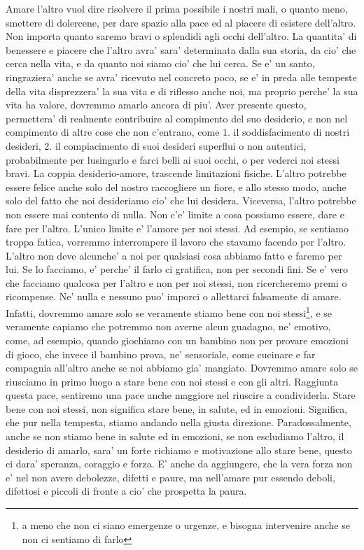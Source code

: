 Amare l'altro vuol dire risolvere il prima possibile i nostri mali, o quanto meno, smettere di dolercene, per dare spazio alla pace ed al piacere di esistere dell'altro. Non importa quanto saremo bravi o splendidi agli occhi dell'altro. 
La quantita' di benessere e piacere che l'altro avra' sara' determinata dalla sua storia, da cio' che cerca nella vita, e da quanto noi siamo cio' che lui cerca.
Se e' un santo, ringraziera' anche se avra' ricevuto nel concreto poco, se e' in preda alle tempeste della vita disprezzera' la sua vita e di riflesso anche noi, ma proprio perche' la sua vita ha valore, dovremmo amarlo ancora di piu'.
Aver presente questo, permettera' di realmente contribuire al compimento del suo desiderio, e non nel compimento di altre cose che non c'entrano, come 1. il soddisfacimento di nostri desideri, 2. il compiacimento di suoi desideri superflui o non autentici, probabilmente per lusingarlo e farci belli ai suoi occhi, o per vederci noi stessi bravi.
La coppia desiderio-amore, trascende limitazioni fisiche. L'altro potrebbe essere felice anche solo del nostro raccogliere un fiore, e allo stesso modo, anche solo del fatto che noi desideriamo cio' che lui desidera. Viceversa, l'altro potrebbe non essere mai contento di nulla.
Non c'e' limite a cosa possiamo essere, dare e fare per l'altro. L'unico limite e' l'amore per noi stessi. Ad esempio, se sentiamo troppa fatica, vorremmo interrompere il lavoro che stavamo facendo per l'altro.
L'altro non deve alcunche' a noi per qualsiasi cosa abbiamo fatto e faremo per lui. Se lo facciamo, e' perche' il farlo ci gratifica, non per secondi fini. Se e' vero che facciamo qualcosa per l'altro e non per noi stessi, non ricercheremo premi o ricompense.
Ne' nulla e nessuno puo' imporci o allettarci falsamente di amare. Infatti, dovremmo amare solo se veramente stiamo bene con noi stessi\footnote{a meno che non ci siano emergenze o urgenze, e bisogna intervenire anche se non ci sentiamo di farlo}, e se veramente capiamo che potremmo non averne alcun guadagno, ne' emotivo, come, ad esempio, quando giochiamo con un bambino non per provare emozioni di gioco, che invece il bambino prova, ne' sensoriale, come cucinare e far compagnia all'altro anche se noi abbiamo gia' mangiato. Dovremmo amare solo se riusciamo in primo luogo a stare bene con noi stessi e con gli altri. Raggiunta questa pace, sentiremo una pace anche maggiore nel riuscire a condividerla.
Stare bene con noi stessi, non significa stare bene, in salute, ed in emozioni. Significa, che pur nella tempesta, stiamo andando nella giusta direzione. Paradossalmente, anche se non stiamo bene in salute ed in emozioni, se non escludiamo l'altro, il desiderio di amarlo, sara' un forte richiamo e motivazione allo stare bene, questo ci dara' speranza, coraggio e forza. 
E' anche da aggiungere, che la vera forza non e' nel non avere debolezze, difetti e paure, ma nell'amare pur essendo deboli, difettosi e piccoli di fronte a cio' che prospetta la paura.

